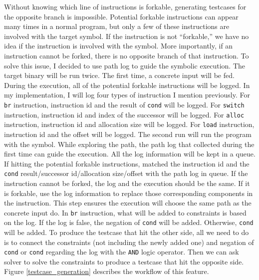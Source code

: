 Without knowing which line of instructions is forkable, generating testcases for the opposite branch is impossible. Potential forkable instructions can appear many times in a normal program, but only a few of these instructions are involved with the target symbol. If the instruction is not ``forkable,'' we have no idea if the instruction is involved with the symbol. More importantly, if an instruction cannot be forked, there is no opposite branch of that instruction. To solve this issue, I decided to use path log to guide the symbolic execution. The target binary will be run twice. The first time, a concrete input will be fed. During the execution, all of the potential forkable instructions will be logged. In my implementation, I will log four types of instruction I mention previously. For \texttt{br} instruction, instruction id and the result of \texttt{cond} will be logged. For \texttt{switch} instruction, instruction id and index of the successor will be logged. For \texttt{alloc} instruction, instruction id and allocation size will be logged. For \texttt{load} instruction, instruction id and the offset will be logged. The second run will run the program with the symbol. While exploring the path, the path log that collected during the first time can guide the execution. All the log information will be kept in a queue. If hitting the potential forkable instructions, matched the instruction id and the \texttt{cond} result/successor id/allocation size/offset with the path log in queue. If the instruction cannot be forked, the log and the execution should be the same. If it is forkable, use the log information to replace those corresponding components in the instruction. This step ensures the execution will choose the same path as the concrete input do. In \texttt{br} instruction, what will be added to constraints is based on the log. If the log is false, the negation of \texttt{cond} will be added. Otherwise, \texttt{cond} will be added. To produce the testcase that hit the other side, all we need to do is to connect the constraints (not including the newly added one) and negation of \texttt{cond} or \texttt{cond} regarding the log with the \texttt{AND} logic operator. Then we can ask solver to solve the constraints to produce a testcase that hit the opposite side. Figure \ref{testcase_generation} describes the workflow of this feature.

